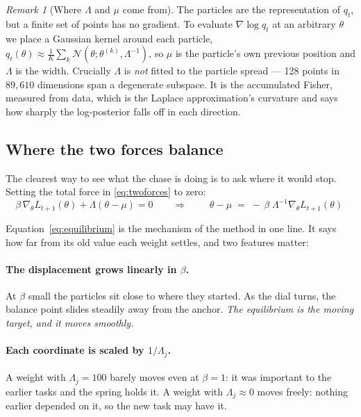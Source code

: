 \documentclass[11pt]{article}
\theoremstyle{definition}
\theoremstyle{plain}
\theoremstyle{remark}
\newtheorem{remark}[definition]{Remark}
\begin{document}
\begin{remark}[Where $\Lambda$ and $\mu$ come from]
The particles are the representation of $q_t$, but a finite set of points has no
gradient. To evaluate $\nabla \log q_t$ at an arbitrary $\theta$ we place a
Gaussian kernel around each particle,
$q_t(\theta) \approx \frac{1}{K}\sum_k \mathcal{N}(\theta; \theta^{(k)},
\Lambda^{-1})$, so $\mu$ is the particle's own previous position and $\Lambda$
is the width. Crucially $\Lambda$ is \emph{not} fitted to the particle spread
--- 128 points in $89{,}610$ dimensions span a degenerate subspace. It is the
accumulated Fisher, measured from data, which is the Laplace approximation's
curvature and says how sharply the log-posterior falls off in each direction.
\end{remark}

\subsection{Where the two forces balance}

The clearest way to see what the chase is doing is to ask where it would stop.
Setting the total force in \eqref{eq:twoforces} to zero:
\begin{equation}
\beta\,\nabla_\theta L_{t+1}(\theta) + \Lambda(\theta - \mu) = 0
\qquad\Longrightarrow\qquad
\boxed{\;\theta - \mu \;=\; -\,\beta\; \Lambda^{-1} \nabla_\theta L_{t+1}(\theta)\;}
\label{eq:equilibrium}
\end{equation}

Equation~\eqref{eq:equilibrium} is the mechanism of the method in one line. It
says how far from its old value each weight settles, and two features matter:

\paragraph{The displacement grows linearly in $\beta$.}
At $\beta$ small the particles sit close to where they started. As the dial
turns, the balance point slides steadily away from the anchor. \emph{The
equilibrium is the moving target, and it moves smoothly.}

\paragraph{Each coordinate is scaled by $1/\Lambda_j$.}
A weight with $\Lambda_j = 100$ barely moves even at $\beta = 1$: it was
important to the earlier tasks and the spring holds it. A weight with
$\Lambda_j \approx 0$ moves freely: nothing earlier depended on it, so the new
task may have it.
\end{document}
